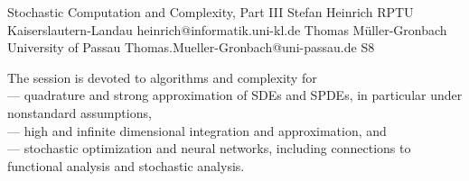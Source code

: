 

\clearpage

\begin{session}
 {Stochastic Computation and Complexity, Part III}%
 {Stefan Heinrich}%
 {RPTU Kaiserslautern-Landau}%
 {heinrich@informatik.uni-kl.de}%
 {Thomas M\"uller-Gronbach}%
 {University of Passau}%
 {Thomas.Mueller-Gronbach@uni-passau.de}%
 {S8}%
 {}%

 The session is devoted to algorithms and complexity for\\
 --- quadrature and strong approximation of SDEs and SPDEs, in particular under nonstandard assumptions,\\
 --- high and infinite dimensional integration and approximation, and\\
 --- stochastic optimization and neural networks,
 including connections to functional analysis and stochastic analysis.
\end{session}



\clearpage


